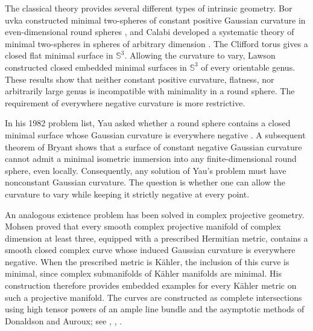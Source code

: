 \documentclass[a4paper,11pt,oneside,reqno]{amsart}
\numberwithin{equation}{section}
\theoremstyle{definition}
\begin{document}
The classical theory provides several different types of
intrinsic geometry. Bor{ u}vka constructed minimal two-spheres
of constant positive Gaussian curvature in even-dimensional
round spheres \cite{BoruvkaSphericalSurfaces}, and Calabi
developed a systematic theory of minimal two-spheres in
spheres of arbitrary dimension
\cite{CalabiMinimalImmersionsSpheres}.
The Clifford torus gives a closed flat minimal surface in
$\mathbb{S}^3$. Allowing the curvature to vary, Lawson
\cite{LawsonCompleteMinimalSurfaces} constructed closed
embedded minimal surfaces in $\mathbb{S}^3$ of every
orientable genus. These results show that neither constant
positive curvature, flatness, nor arbitrarily large genus
is incompatible with minimality in a round sphere.
The requirement of everywhere negative curvature is more
restrictive.

In his 1982 problem list, Yau asked whether a round sphere
contains a closed minimal surface whose Gaussian curvature
is everywhere negative
\cite[Problem~101]{YauProblemSection}.
A subsequent theorem of Bryant
\cite[Theorem~2.3]{BryantConstantCurvature}
shows that a surface of constant negative Gaussian curvature
cannot admit a minimal isometric immersion into any
finite-dimensional round sphere, even locally.
Consequently, any solution of Yau's problem must have
nonconstant Gaussian curvature. The question is whether
one can allow the curvature to vary while keeping it
strictly negative at every point. 

An analogous existence problem has been solved in complex
projective geometry. Mohsen
\cite{MohsenNegativelyCurvedCompleteIntersections}
proved that every smooth complex projective manifold of
complex dimension at least three, equipped with a prescribed
Hermitian metric, contains a smooth closed complex curve
whose induced Gaussian curvature is everywhere negative.
When the prescribed metric is K\"ahler, the inclusion of
this curve is minimal, since complex submanifolds of
K\"ahler manifolds are minimal. His construction therefore
provides embedded examples for every K\"ahler metric on
such a projective manifold. The curves are constructed
as complete intersections using high tensor powers of
an ample line bundle and the asymptotic methods of
Donaldson and Auroux; see \cite{Donaldson1996}, \cite{Auroux1997}, \cite{Auroux2001Estimated}.
\end{document}
